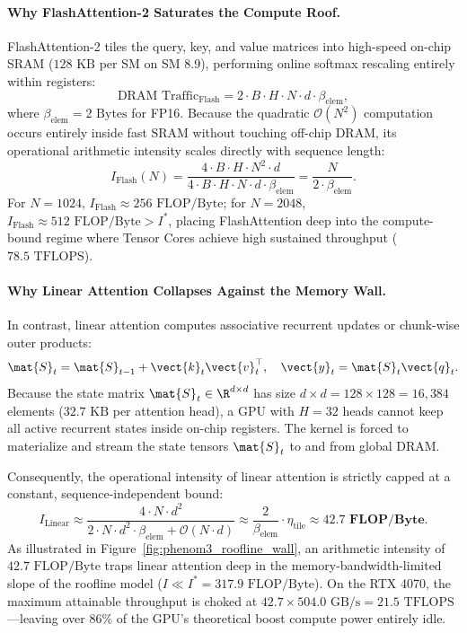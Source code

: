 \paragraph{Why FlashAttention-2 Saturates the Compute Roof.}
FlashAttention-2 tiles the query, key, and value matrices into high-speed on-chip SRAM ($128\text{ KB}$ per SM on SM 8.9), performing online softmax rescaling entirely within registers:
\begin{equation}
\text{DRAM Traffic}_{\text{Flash}} = 2 \cdot B \cdot H \cdot N \cdot d \cdot \beta_{\text{elem}},
\end{equation}
where $\beta_{\text{elem}} = 2\text{ Bytes}$ for FP16. Because the quadratic $\mathcal{O}(N^2)$ computation occurs entirely inside fast SRAM without touching off-chip DRAM, its operational arithmetic intensity scales directly with sequence length:
\begin{equation}
I_{\text{Flash}}(N) = \frac{4 \cdot B \cdot H \cdot N^2 \cdot d}{4 \cdot B \cdot H \cdot N \cdot d \cdot \beta_{\text{elem}}} = \frac{N}{2 \cdot \beta_{\text{elem}}}.
\end{equation}
For $N = 1024$, $I_{\text{Flash}} \approx 256\text{ FLOP/Byte}$; for $N = 2048$, $I_{\text{Flash}} \approx 512\text{ FLOP/Byte} > I^*$, placing FlashAttention deep into the compute-bound regime where Tensor Cores achieve high sustained throughput ($78.5\text{ TFLOPS}$).

\paragraph{Why Linear Attention Collapses Against the Memory Wall.}
In contrast, linear attention computes associative recurrent updates or chunk-wise outer products:
\begin{equation}
\mat{S}_t = \mat{S}_{t-1} + \vect{k}_t \vect{v}_t^\top, \quad \vect{y}_t = \mat{S}_t \vect{q}_t.
\end{equation}
Because the state matrix $\mat{S}_t \in \R^{d \times d}$ has size $d \times d = 128 \times 128 = 16{,}384$ elements ($32.7\text{ KB}$ per attention head), a GPU with $H=32$ heads cannot keep all active recurrent states inside on-chip registers. The kernel is forced to materialize and stream the state tensors $\mat{S}_t$ to and from global DRAM. 

Consequently, the operational intensity of linear attention is strictly capped at a constant, sequence-independent bound:
\begin{equation}
I_{\text{Linear}} \approx \frac{4 \cdot N \cdot d^2}{2 \cdot N \cdot d^2 \cdot \beta_{\text{elem}} + \mathcal{O}(N \cdot d)} \approx \frac{2}{\beta_{\text{elem}}} \cdot \eta_{\text{tile}} \approx \mathbf{42.7\text{ FLOP/Byte}}.
\end{equation}
As illustrated in Figure~\ref{fig:phenom3_roofline_wall}, an arithmetic intensity of $42.7\text{ FLOP/Byte}$ traps linear attention deep in the memory-bandwidth-limited slope of the roofline model ($I \ll I^* = 317.9\text{ FLOP/Byte}$). On the RTX 4070, the maximum attainable throughput is choked at $42.7 \times 504.0\text{ GB/s} = 21.5\text{ TFLOPS}$---leaving over $86\%$ of the GPU's theoretical boost compute power entirely idle. 

